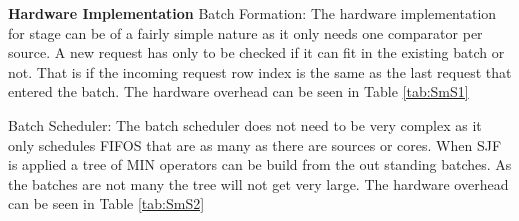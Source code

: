 \documentclass[12pt,journal,compsoc]{IEEEtran}
\begin{document}
\textbf{Hardware Implementation}
Batch Formation:  The hardware implementation for stage can be of a fairly simple nature as it only needs one comparator per source.  A new request has only to be checked if it can fit in the existing batch or not.  That is if the incoming request row index is the same as the last request that entered the batch.  The hardware overhead can be seen in Table \ref{tab:SmS1}

\begin{table}[H]
  \centering
  \caption{Storage Overhead of Stage 1: Batch formation stage \cite{SmS}}\label{tab:SmS1}
\end{table}

Batch Scheduler:  The batch scheduler does not need to be very complex as it only schedules FIFOS that are as many as there are sources or cores.  When SJF is applied a tree of MIN operators can be build from the out standing batches.  As the batches are not many the tree will not get very large. The hardware overhead can be seen in Table \ref{tab:SmS2}

\begin{table}[H]
  \centering
  \caption{Storage Overhead of Stage 2: Batch Schedule \cite{SmS}}\label{tab:SmS2}
\end{table}
\end{document}

